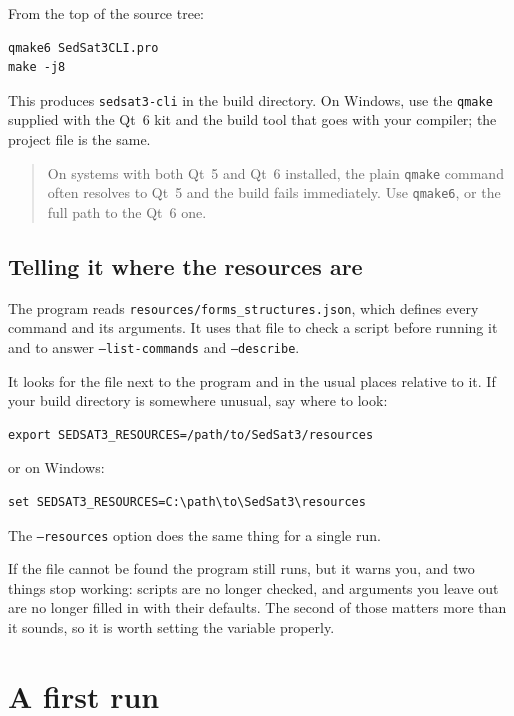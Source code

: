 \documentclass[11pt,a4paper]{report}
\begin{document}
From the top of the source tree:

\begin{lstlisting}
qmake6 SedSat3CLI.pro
make -j8
\end{lstlisting}

This produces \texttt{sedsat3-cli} in the build directory. On Windows, use the
\texttt{qmake} supplied with the Qt~6 kit and the build tool that goes with
your compiler; the project file is the same.

\begin{quote}
\small
On systems with both Qt~5 and Qt~6 installed, the plain \texttt{qmake} command
often resolves to Qt~5 and the build fails immediately. Use \texttt{qmake6},
or the full path to the Qt~6 one.
\end{quote}

\section{Telling it where the resources are}

The program reads \texttt{resources/forms\_structures.json}, which defines
every command and its arguments. It uses that file to check a script before
running it and to answer \texttt{--list-commands} and \texttt{--describe}.

It looks for the file next to the program and in the usual places relative to
it. If your build directory is somewhere unusual, say where to look:

\begin{lstlisting}
export SEDSAT3_RESOURCES=/path/to/SedSat3/resources
\end{lstlisting}

or on Windows:

\begin{lstlisting}
set SEDSAT3_RESOURCES=C:\path\to\SedSat3\resources
\end{lstlisting}

The \texttt{--resources} option does the same thing for a single run.

If the file cannot be found the program still runs, but it warns you, and two
things stop working: scripts are no longer checked, and arguments you leave out
are no longer filled in with their defaults. The second of those matters more
than it sounds, so it is worth setting the variable properly.

\chapter{A first run}
\label{ch:quickstart}
\end{document}

